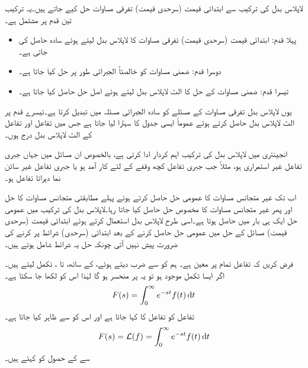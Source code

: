 لاپلاس بدل کی ترکیب سے ابتدائی قیمت (سرحدی قیمت) تفرقی مساوات حل کیے جاتے ہیں۔یہ ترکیب تین قدم پر مشتمل ہے۔
\begin{itemize}
\item
پہلا قدم: ابتدائی قیمت (سرحدی قیمت) تفرقی مساوات کا لاپلاس بدل لیتے ہوئے سادہ  حاصل کی جاتی ہے۔
\item
دوسرا قدم:  ضمنی مساوات کو خالصتاً الجبرائی طور پر حل کیا جاتا ہے۔
\item
تیسرا قدم: ضمنی مساوات کے حل کا الٹ لاپلاس بدل لیتے ہوئے اصل حل حاصل کیا جاتا ہے۔
\end{itemize}  

یوں لاپلاس بدل تفرقی مساوات کے مسئلے کو سادہ الجبرائی مسئلہ میں تبدیل کرتا ہے۔تیسرے قدم پر الٹ لاپلاس بدل حاصل کرتے ہوئے عموماً ایسی جدول کا سہارا لیا جاتا ہے جس  میں تفاعل اور تفاعل کے الٹ لاپلاس بدل درج ہوں۔ 

انجینئری میں لاپلاس بدل کی ترکیب اہم کردار ادا کرتی ہے، بالخصوص ان مسائل میں جہاں جبری تفاعل غیر استمراری ہو، مثلاً جب جبری تفاعل کچھ وقفے کے لئے کار آمد ہو یا جبری تفاعل غیر سائن نما دہراتا تفاعل ہو۔

اب تک غیر متجانس مساوات کا عمومی حل حاصل کرتے ہوئے پہلے مطابقتی متجانس مساوات کا حل اور پھر غیر متجانس مساوات کا مخصوص حل حاصل کیا جاتا رہا۔لاپلاس بدل کی ترکیب میں عمومی حل ایک ہی بار میں حاصل ہوتا ہے۔اسی طرح لاپلاس بدل استعمال کرتے ہوئے ابتدائی قیمت (سرحدی قیمت) مسائل کے حل میں عمومی حل حاصل کرنے کے بعد ابتدائی (سرحدی) شرائط پر کرنے کی ضرورت پیش نہیں آتی چونکہ حل یہ شرائط شامل ہوتے ہیں۔

فرض کریں کہ تفاعل  تمام  پر معین ہے۔ ہم  کو  سے ضرب دیتے ہوئے،   کے ساتھ،  تا ، تکمل لیتے ہیں۔ اگر ایسا تکمل موجود ہو تو یہ  پر منحسر ہو گا لہٰذا اس کو  لکھا جا سکتا ہے۔
\begin{align}
F(s)=\int_{0}^{\infty}e^{-st}f(t)\dif t
\end{align} 
تفاعل  کو تفاعل  کا  کہا جاتا ہے اور اس کو
  سے ظاہر کیا جاتا ہے۔
\begin{align}\label{مساوات_لاپلاس_بدل_الف}
F(s)=\Laplace(f)=\int_{0}^{\infty} e^{-st} f(t)\dif t
\end{align}
 سے  کے حصول کو  کہتے ہیں۔

